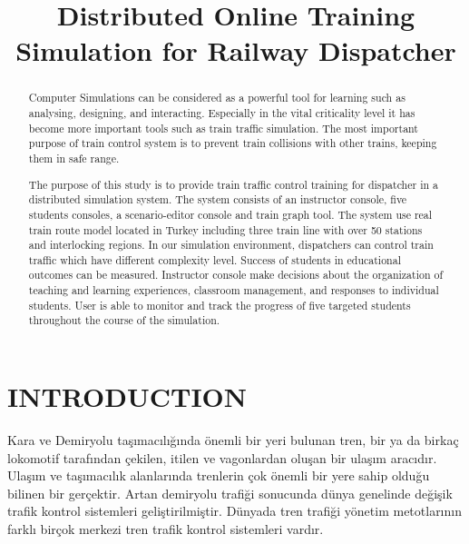 \documentclass[conference]{IEEEtran}
\begin{document}
\title{Distributed Online Training Simulation for Railway Dispatcher }



\author{
}

\maketitle

\begin{abstract}
Computer Simulations can be considered as a powerful tool for learning such as analysing, designing, and interacting. Especially in the vital criticality level it has become more important tools such as train traffic simulation.
The most important purpose of train control system is to prevent train collisions with other trains, keeping them in safe range.

The purpose of this study is to provide train traffic control training for dispatcher in a distributed simulation system. The system consists of an instructor console, five students consoles, a scenario-editor console and train graph tool. The system use real train route model located in Turkey including three train line with over 50 stations and interlocking regions.  In our simulation environment, dispatchers can control train traffic which have different  complexity level. Success of students in educational outcomes can be measured. Instructor console make decisions about the organization of teaching and learning experiences, classroom management, and responses to individual students. User is able to monitor and track the progress of five targeted students throughout the course of the simulation.

\end{abstract}

\section{INTRODUCTION}
Kara ve Demiryolu taşımacılığında önemli bir yeri bulunan tren, bir ya da birkaç lokomotif tarafından çekilen, itilen ve vagonlardan oluşan bir ulaşım aracıdır. Ulaşım ve taşımacılık alanlarında trenlerin çok önemli bir yere sahip olduğu bilinen bir gerçektir. 
Artan demiryolu trafiği sonucunda dünya genelinde değişik trafik kontrol sistemleri geliştirilmiştir. Dünyada tren trafiği yönetim metotlarının farklı birçok merkezi tren trafik kontrol sistemleri vardır.
\end{document}
